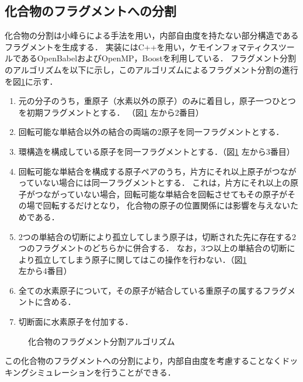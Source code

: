 \subsection{化合物のフラグメントへの分割}\label{subsec:decomposition}
化合物の分割は小峰らによる手法\cite{Shunta2015}を用い，内部自由度を持たない部分構造であるフラグメントを生成する．
実装にはC++を用い，ケモインフォマティクスツールであるOpenBabel\cite{OBoyle2011}およびOpenMP，Boostを利用している．
フラグメント分割のアルゴリズムを以下に示し，このアルゴリズムによるフラグメント分割の進行を図\ref{fig:decomposition}に示す．
\begin{enumerate} 
\item 元の分子のうち，重原子（水素以外の原子）のみに着目し，原子一つひとつを初期フラグメントとする．
	（図\ref{fig:decomposition} 左から2番目）
\item 回転可能な単結合以外の結合の両端の2原子を同一フラグメントとする．
\item 環構造を構成している原子を同一フラグメントとする．（図\ref{fig:decomposition} 左から3番目）
\item 回転可能な単結合を構成する原子ペアのうち，片方にそれ以上原子がつながっていない場合には同一フラグメントとする．
	これは，片方にそれ以上の原子がつながっていない場合，回転可能な単結合を回転させてもその原子がその場で回転するだけとなり，
	化合物の原子の位置関係には影響を与えないためである．
\item 2つの単結合の切断により孤立してしまう原子は，切断された先に存在する2つのフラグメントのどちらかに併合する．
	なお，3つ以上の単結合の切断により孤立してしまう原子に関してはこの操作を行わない．（図\ref{fig:decomposition} 左から4番目）
\item 全ての水素原子について，その原子が結合している重原子の属するフラグメントに含める．
\item 切断面に水素原子を付加する．
\end{enumerate}
\begin{figure}[htp]
 \begin{center}
  \caption{化合物のフラグメント分割アルゴリズム\cite{Shunta2015}}
  \label{fig:decomposition}
 \end{center}
\end{figure}
この化合物のフラグメントへの分割により，内部自由度を考慮することなくドッキングシミュレーションを行うことができる．

